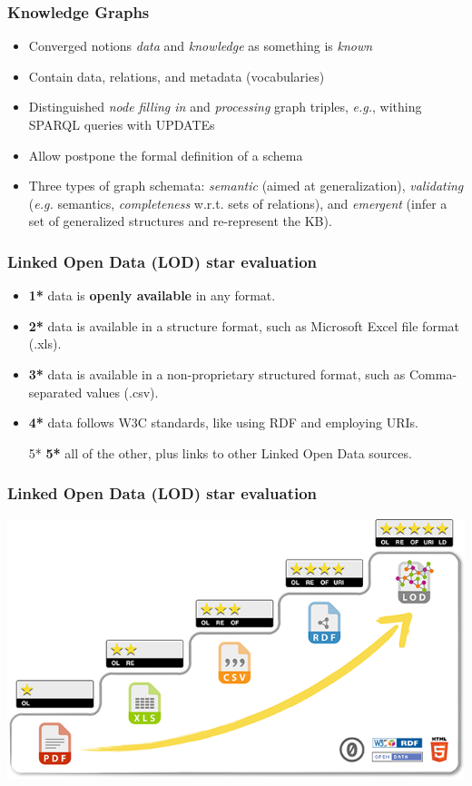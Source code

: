 \documentclass[10pt]{beamer}
\begin{document}

\begin{frame}
  \frametitle{Knowledge Graphs}
  \begin{itemize}
  \item Converged notions \emph{data} and \emph{knowledge} as something is \emph{known}
  \item Contain data, relations, and metadata (vocabularies)
  \item Distinguished \emph{node filling in} and \emph{processing} graph triples, \emph{e.g.}, withing SPARQL queries with UPDATEs
  \item Allow postpone the formal definition of a schema
  \item Three types of graph schemata: \emph{semantic} (aimed at generalization), \emph{validating} (\emph{e.g.} semantics, \emph{completeness} w.r.t. sets of relations), and \emph{emergent} (infer a set of generalized structures and re-represent the KB).
  \end{itemize}
\end{frame}


\begin{frame}
  \frametitle{Linked Open Data (LOD) star evaluation}
  \begin{itemize}
  \item \textbf{1*} data is \textbf{openly available} in any format.
  \item \textbf{2*} data is available in a structure format, such as Microsoft Excel file format (.xls).
  \item \textbf{3*} data is available in a non-proprietary structured format, such as Comma-separated values (.csv).
  \item \textbf{4*} data follows W3C standards, like using RDF and employing URIs.
  \item[5*] \textbf{5*} all of the other, plus links to other Linked Open Data sources.
  \end{itemize}
\end{frame}

\begin{frame}
  \frametitle{Linked Open Data (LOD) star evaluation}
  \centering
  \includegraphics[width=\linewidth]{5-star-lod.png}
\end{frame}
\end{document}
